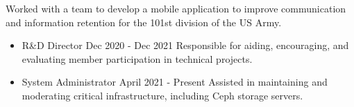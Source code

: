 \documentclass[10pt,a4paper,ragged2e,withhyper]{altacv}
\begin{document}
\begin{paracol}{2}
    \divider
    
    Worked with a team to develop a mobile application to improve communication and information retention for the 101st division of the US Army.
    \smallskip \smallskip \newline
      

    \switchcolumn

           
        \newline
         \newline {}


        \begin{itemize}
        \item {{\color{emphasis}R\&D Director} {{\color{accent}\faCalendar}\color{emphasis} Dec 2020 - Dec 2021}
            \newline
            \smallskip
            Responsible for aiding, encouraging, and evaluating member participation in technical projects.
        }
        \newline
        \item {{\color{emphasis}System Administrator} {\color{accent}\faCalendar\color{emphasis} April 2021 - Present}
            \newline
            \smallskip
            Assisted in maintaining and moderating critical infrastructure, including Ceph storage servers.}
        \end{itemize}    

    
            
           
         


    \switchcolumn

    \end{paracol}
\end{document}
